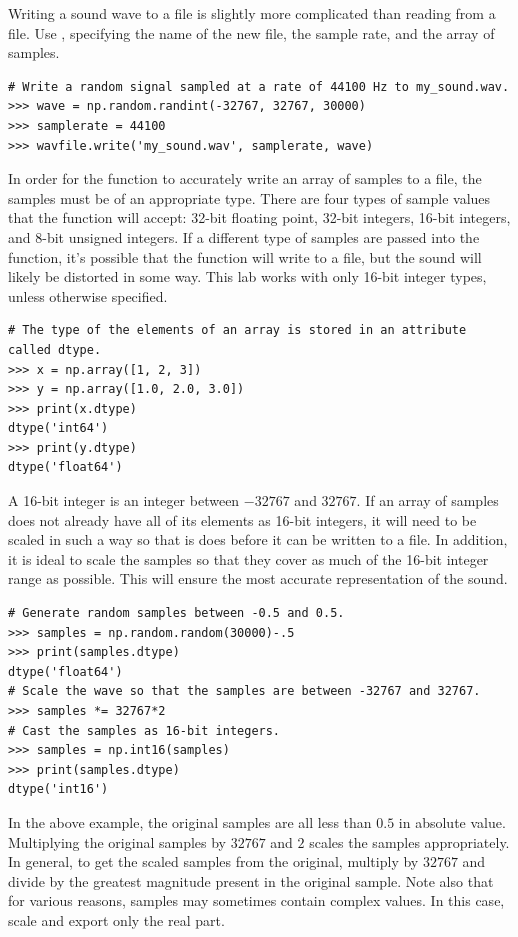 Writing a sound wave to a file is slightly more complicated than reading from a file.
Use , specifying the name of the new file, the sample rate, and the array of samples.

\begin{lstlisting}
# Write a random signal sampled at a rate of 44100 Hz to my_sound.wav.
>>> wave = np.random.randint(-32767, 32767, 30000)
>>> samplerate = 44100
>>> wavfile.write('my_sound.wav', samplerate, wave)
\end{lstlisting}

In order for the  function to accurately write an array of samples to a file, the samples must be of an appropriate type.
There are four types of sample values that the function will accept: 32-bit floating point, 32-bit integers, 16-bit integers, and 8-bit unsigned integers.
If a different type of samples are passed into the function, it's possible that the function will write to a file, but the sound will likely be distorted in some way.
This lab works with only 16-bit integer types, unless otherwise specified.

\begin{lstlisting}
# The type of the elements of an array is stored in an attribute called dtype.
>>> x = np.array([1, 2, 3])
>>> y = np.array([1.0, 2.0, 3.0])
>>> print(x.dtype)
dtype('int64')
>>> print(y.dtype)
dtype('float64')
\end{lstlisting}

A 16-bit integer is an integer between $-32767$ and $32767$.
If an array of samples does not already have all of its elements as 16-bit integers, it will need to be scaled in such a way so that is does before it can be written to a file.
In addition, it is ideal to scale the samples so that they cover as much of the 16-bit integer range as possible.
This will ensure the most accurate representation of the sound.

\begin{lstlisting}
# Generate random samples between -0.5 and 0.5.
>>> samples = np.random.random(30000)-.5
>>> print(samples.dtype)
dtype('float64')
# Scale the wave so that the samples are between -32767 and 32767.
>>> samples *= 32767*2
# Cast the samples as 16-bit integers.
>>> samples = np.int16(samples)
>>> print(samples.dtype)
dtype('int16')
\end{lstlisting}

In the above example, the original samples are all less than $0.5$ in absolute value.
Multiplying the original samples by $32767$ and $2$ scales the samples appropriately.
In general, to get the scaled samples from the original, multiply by $32767$ and divide by the greatest magnitude present in the original sample.
Note also that for various reasons, samples may sometimes contain complex values.
In this case, scale and export only the real part.

